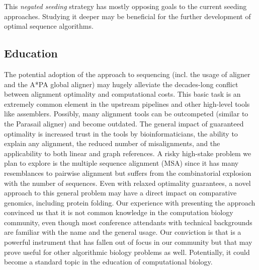 This \emph{negated seeding} strategy has mostly opposing goals to the current
seeding approaches. Studying it deeper may be beneficial for the further
development of optimal sequence algorithms.


\subsection*{Education}

The potential adoption of the \A approach to sequencing (incl. the usage of
\astarix aligner and the A*PA global aligner) may hugely alleviate the
decades-long conflict between alignment optimality and computational costs. This
basic task is an extremely common element in the upstream pipelines and other
high-level tools like assemblers. Possibly, many alignment tools can be
outcompeted (similar to the Parasail aligner) and become outdated. The general
impact of guaranteed optimality is increased trust in the tools by
bioinformaticians, the ability to explain any alignment, the reduced number of
misalignments, and the applicability to both linear and graph references. A
risky high-stake problem we plan to explore is the multiple sequence alignment
(MSA) since it has many resemblances to pairwise alignment but suffers from the
combinatorial explosion with the number of sequences. Even with relaxed
optimality guarantees, a novel approach to this general problem may have a
direct impact on comparative genomics, including protein folding. Our experience
with presenting the \A approach convinced us that it is not common knowledge in
the computation biology community, even though most conference attendants with
technical backgrounds are familiar with the name and the general usage. Our
conviction is that \A is a powerful instrument that has fallen out of focus in
our community but that may prove useful for other algorithmic biology problems
as well. Potentially, it could become a standard topic in the education of
computational biology.